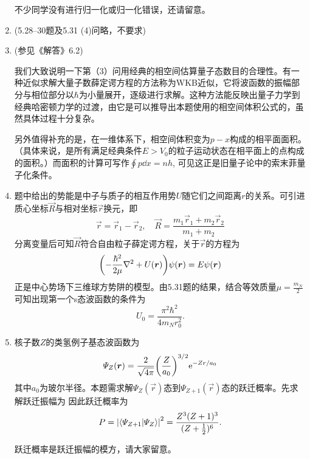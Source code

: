 \begin{enumerate}[label=\textbf{5.\arabic*}, listparindent=\parindent, leftmargin=-0.5mm]
不少同学没有进行归一化或归一化错误，还请留意。
\item (5.28--30题及5.31 (4)问略，不要求)

\setcounter{enumi}{30}
\item (参见《解答》6.2)

 我们大致说明一下第（3）问用经典的相空间估算量子态数目的合理性。有一种近似求解大量子数薛定谔方程的方法称为WKB近似，它将波函数的振幅部分与相位部分以$\hbar$为小量展开，逐级进行求解。这种方法能反映出量子力学到经典哈密顿力学的过渡，由它是可以推导出本题使用的相空间体积公式的，虽然具体过程十分复杂。

另外值得补充的是，在一维体系下，相空间体积变为$p-x$构成的相平面面积。（具体来说，是所有满足经典条件$E>V_0$的粒子运动状态在相平面上的点构成的面积。）而面积的计算可写作$\oint p\dd{x}=nh$, 可见这正是旧量子论中的索末菲量子化条件。


\item 题中给出的势能是中子与质子的相互作用势$U$随它们之间距离$r$的关系。可引进质心坐标$\vec{R}$与相对坐标$\vec{r}$换元，即
\[\vec{r}=\vec{r}_1-\vec{r}_2,\quad \vec{R}=\frac{m_1\vec{r}_1+m_2\vec{r}_2}{m_1+m_2}\]
分离变量后可知$\vec{R}$符合自由粒子薛定谔方程，关于$\vec{r}$的方程为
\[\qty(-\frac{\hbar^2}{2\mu}\laplacian + U(\vec{r}))\psi(\vec{r})=E\psi(\vec{r})\]
正是中心势场下三维球方势阱的模型。由5.31题的结果，结合等效质量$\mu = \frac{m_N}{2}$可知出现第一个s态波函数的条件为
\[U_0 = \frac{\pi^2\hbar^2}{4m_N r_0^2}.\]


\item 核子数$Z$的类氢例子基态波函数为
\[\varPsi_Z(\boldsymbol{r}) = \frac{2}{\sqrt{4\pi}}\qty(\frac{Z}{a_0})^{3/2}\mathrm{e}^{-Zr/a_0}\]
其中$a_0$为玻尔半径。本题需求解$\varPsi_Z(\vec{r})$态到$\varPsi_{Z+1}(\vec{r})$态的跃迁概率。先求解跃迁振幅为
因此跃迁概率为
\[P = \abs{\braket{\varPsi_{Z+1}}{\varPsi_Z}}^2 = \frac{Z^3(Z+1)^3}{(Z+\frac{1}{2})^6}.\]

跃迁概率是跃迁振幅的模方，请大家留意。

\end{enumerate}

